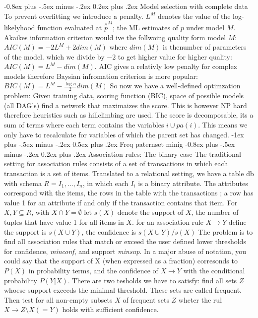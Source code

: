 \documentclass[9pt,landscape]{extarticle}
\makeatletter
\renewcommand{\section}{\@startsection{section}{1}{0mm}%
                                {-1ex plus -.5ex minus -.2ex}%
                                {0.5ex plus .2ex}%
                                {\normalfont\large\bfseries}}
\renewcommand{\subsection}{\@startsection{subsection}{2}{0mm}%
                                {-0.8ex plus -.5ex minus -.2ex}%
                                {0.2ex plus .2ex}%
                                {\normalfont\normalsize\bfseries}}
\makeatother
\begin{document}
\begin{multicols}{3}
\subsection{Model selection with complete data}
To prevent overfitting we introduce a penalty. $L^M$ denotes the value of the
log-likelyhood function evaluated at $\overset{\wedge}{p}^M$; the ML estimates
of $p$ under model $M$. Akaikes information criterion would ive the follwoing
quality form model $M$: $AIC(M)=-2L^M+2dim(M)$ where $dim(M)$ is thenumber of
parameters of the model. which we divide by $-2$ to get higher value for higher
quality: $AIC(M)=L^M-dim(M)$. AIC gives a relativly low penalty for complex
models therefore Baysian infromation criterion is more popular:
$BIC(M)=L^M-\frac{\log n}{2} dim(M)$
So now we have a well-defined optimzation problem: Given training data, scoring
function (BIC), space of possible models (all DAG's) find a network that
maximaizes the score.
This is however NP hard therefore heuristics such as hillclimbing are used.
The score is decomposable, its a sum of terms where each term contains the
variables $i \cup pa(i)$. This means we only have to recalculate for variables
of which the parent set has changed.
\section{Freq paternset minig}
\subsection{Association rules: The binary case}
The traditional setting for association rules consists of a set of transactions
in which each transaction is a set of items.
Translated to a relational setting,
we have a table db with schema $R = {I_1 , \dots, I_n }$,
in which each $I_i$ is a binary attribute.
The attributes correspond with the items,
the rows in the table with the transactions
; a row has value 1 for an attribute if and only if the transaction contains
that item.
For $X,Y \subseteq R$, with $X\cap Y=\emptyset$ let $s(X)$ denote the support of
$X$, the number of tuples that have value 1 for all items in $X$. for an
association rule $X \to Y$ define the support is $s(X\cup Y)$, the confidence is
$s(X\cup Y)/s(X)$
The problem is to find all association rules that match or exceed the user
defined lower thresholds for confidence, \emph{minconf}, and support
\emph{minsup}.
In a major abuse of notation,
you could say that the support of X (when expressed as a fraction) corresonds
to $P (X)$ in probability terms,
and the confidence of $X \to Y$ with the conditional probability $P (Y | X)$.
There are two tesholds we have to satisfy:
find all sets $Z$ whoese support exceeds the minimal threshold. These sets are
called frequent. Then test for all non-empty subsets $X$ of frequent sets $Z$
wheter the rul $X \to Z \setminus X(=Y)$ holds with sufficient confidence.

\end{multicols}
\end{document}
